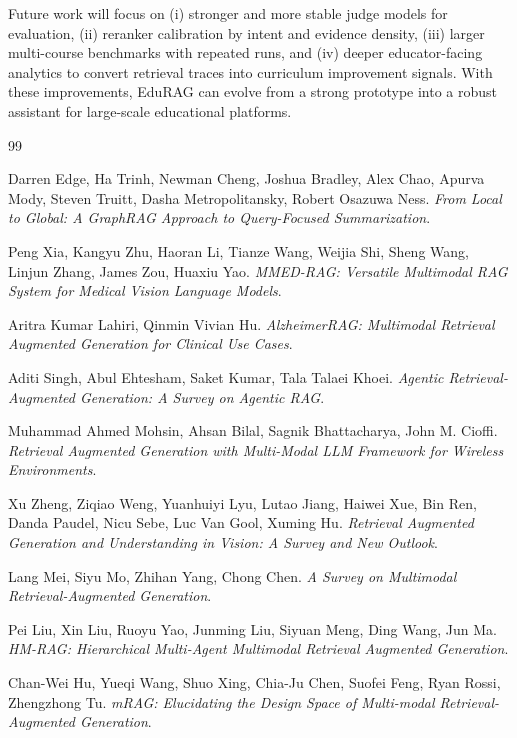 \documentclass[conference]{IEEEtran}
\begin{document}
    Future work will focus on (i) stronger and more stable judge models for evaluation, (ii) reranker calibration by intent and evidence density, (iii) larger multi-course benchmarks with repeated runs, and (iv) deeper educator-facing analytics to convert retrieval traces into curriculum improvement signals. With these improvements, EduRAG can evolve from a strong prototype into a robust assistant for large-scale educational platforms.


    \begin{thebibliography}{99}

    Darren Edge, Ha Trinh, Newman Cheng, Joshua Bradley, Alex Chao, Apurva Mody, Steven Truitt, Dasha Metropolitansky, Robert Osazuwa Ness.
    \textit{From Local to Global: A GraphRAG Approach to Query-Focused Summarization}.

    Peng Xia, Kangyu Zhu, Haoran Li, Tianze Wang, Weijia Shi, Sheng Wang, Linjun Zhang, James Zou, Huaxiu Yao.
    \textit{MMED-RAG: Versatile Multimodal RAG System for Medical Vision Language Models}.

    Aritra Kumar Lahiri, Qinmin Vivian Hu.
    \textit{AlzheimerRAG: Multimodal Retrieval Augmented Generation for Clinical Use Cases}.

    Aditi Singh, Abul Ehtesham, Saket Kumar, Tala Talaei Khoei.
    \textit{Agentic Retrieval-Augmented Generation: A Survey on Agentic RAG}.

    Muhammad Ahmed Mohsin, Ahsan Bilal, Sagnik Bhattacharya, John M. Cioffi.
    \textit{Retrieval Augmented Generation with Multi-Modal LLM Framework for Wireless Environments}.

    Xu Zheng, Ziqiao Weng, Yuanhuiyi Lyu, Lutao Jiang, Haiwei Xue, Bin Ren, Danda Paudel, Nicu Sebe, Luc Van Gool, Xuming Hu.
    \textit{Retrieval Augmented Generation and Understanding in Vision: A Survey and New Outlook}.

    Lang Mei, Siyu Mo, Zhihan Yang, Chong Chen.
    \textit{A Survey on Multimodal Retrieval-Augmented Generation}.

    Pei Liu, Xin Liu, Ruoyu Yao, Junming Liu, Siyuan Meng, Ding Wang, Jun Ma.
    \textit{HM-RAG: Hierarchical Multi-Agent Multimodal Retrieval Augmented Generation}.

    Chan-Wei Hu, Yueqi Wang, Shuo Xing, Chia-Ju Chen, Suofei Feng, Ryan Rossi, Zhengzhong Tu.
    \textit{mRAG: Elucidating the Design Space of Multi-modal Retrieval-Augmented Generation}.


\end{thebibliography}
\end{document}
